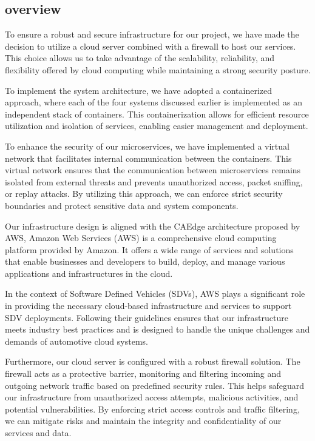 \documentclass[
12pt,
oneside, 
onehalfspacing, 
nolistspacing, 
parskip, 
chapterinoneline, 
]{AASTCOMPUTER}
\begin{document}
\subsection{overview}
To ensure a robust and secure infrastructure for our project, we have made the decision to utilize a cloud server combined with a firewall to host our services. This choice allows us to take advantage of the scalability, reliability, and flexibility offered by cloud computing while maintaining a strong security posture.

To implement the system architecture, we have adopted a containerized approach, where each of the four systems discussed earlier is implemented as an independent stack of containers. This containerization allows for efficient resource utilization and isolation of services, enabling easier management and deployment.

To enhance the security of our microservices, we have implemented a virtual network that facilitates internal communication between the containers. This virtual network ensures that the communication between microservices remains isolated from external threats and prevents unauthorized access, packet sniffing, or replay attacks. By utilizing this approach, we can enforce strict security boundaries and protect sensitive data and system components.

Our infrastructure design is aligned with the CAEdge architecture proposed by AWS, Amazon Web Services (AWS) is a comprehensive cloud computing platform provided by Amazon. It offers a wide range of services and solutions that enable businesses and developers to build, deploy, and manage various applications and infrastructures in the cloud.

In the context of Software Defined Vehicles (SDVs), AWS plays a significant role in providing the necessary cloud-based infrastructure and services to support SDV deployments. Following their guidelines ensures that our infrastructure meets industry best practices and is designed to handle the unique challenges and demands of automotive cloud systems.

Furthermore, our cloud server is configured with a robust firewall solution. The firewall acts as a protective barrier, monitoring and filtering incoming and outgoing network traffic based on predefined security rules. This helps safeguard our infrastructure from unauthorized access attempts, malicious activities, and potential vulnerabilities. By enforcing strict access controls and traffic filtering, we can mitigate risks and maintain the integrity and confidentiality of our services and data.
\end{document}
